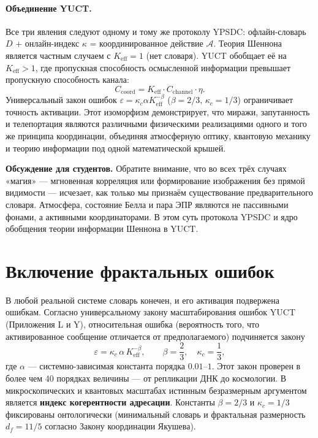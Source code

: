 \documentclass[12pt,a4paper]{article}
\theoremstyle{remark}
\begin{document}
	\paragraph{Объединение YUCT.}
	Все три явления следуют одному и тому же протоколу YPSDC: офлайн-словарь $D$ + онлайн-индекс $\kappa$ = координированное действие $\mathcal{A}$. Теория Шеннона является частным случаем с $K_{\mathrm{eff}}=1$ (нет словаря). YUCT обобщает её на $K_{\mathrm{eff}}>1$, где пропускная способность осмысленной информации превышает пропускную способность канала:
	\[
	C_{\mathrm{coord}} = K_{\mathrm{eff}} \cdot C_{\mathrm{channel}} \cdot \eta.
	\]
	Универсальный закон ошибок $\varepsilon = \kappa_c \alpha K_{\mathrm{eff}}^{-\beta}$ ($\beta=2/3$, $\kappa_c=1/3$) ограничивает точность активации. Этот изоморфизм демонстрирует, что миражи, запутанность и телепортация являются различными физическими реализациями одного и того же принципа координации, объединяя атмосферную оптику, квантовую механику и теорию информации под одной математической крышей.
	
	\vspace{0.2cm}
	\noindent\textbf{Обсуждение для студентов.} 
	Обратите внимание, что во всех трёх случаях «магия» — мгновенная корреляция или формирование изображения без прямой видимости — исчезает, как только мы признаём существование предварительного словаря. Атмосфера, состояние Белла и пара ЭПР являются не пассивными фонами, а активными координаторами. В этом суть протокола YPSDC и ядро обобщения теории информации Шеннона в YUCT.
	
	\section{Включение фрактальных ошибок}
	\label{sec:errors}
	
	В любой реальной системе словарь конечен, и его активация подвержена ошибкам. Согласно универсальному закону масштабирования ошибок YUCT (Приложения L и Y), относительная ошибка (вероятность того, что активированное сообщение отличается от предполагаемого) подчиняется закону
	\begin{equation}
		\boxed{\varepsilon = \kappa_c \, \alpha \, K_{\mathrm{eff}}^{-\beta}}, \qquad 
		\beta = \frac{2}{3},\quad \kappa_c = \frac{1}{3},
		\label{eq:error-law-corrected}
	\end{equation}
	где $\alpha$ — системно-зависимая константа порядка $0.01$–$1$. Этот закон проверен в более чем 40 порядках величины — от репликации ДНК до космологии.  
	В микроскопических и квантовых масштабах истинным безразмерным аргументом является \textbf{индекс когерентности адресации}. Константы $\beta = 2/3$ и $\kappa_c = 1/3$ фиксированы онтологически (минимальный словарь и фрактальная размерность $d_f = 11/5$ согласно Закону координации Якушева).
	
\end{document}
